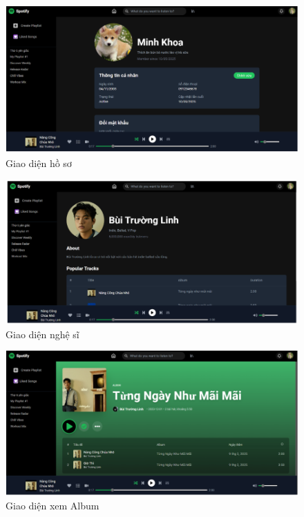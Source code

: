 \begin{figure}
    \centering
    \includegraphics[width=1\linewidth]{images/ui-profile.png}
    \caption{Giao diện hồ sơ}
    \label{fig:ui-profile}
\end{figure}

\begin{figure}
    \centering
    \includegraphics[width=1\linewidth]{images/ui-artist.png}
    \caption{Giao diện nghệ sĩ}
    \label{fig:ui-artist}
\end{figure}

\begin{figure}
    \centering
    \includegraphics[width=1\linewidth]{images/ui-album.png}
    \caption{Giao diện xem Album}
    \label{fig:ui-album}
\end{figure}

